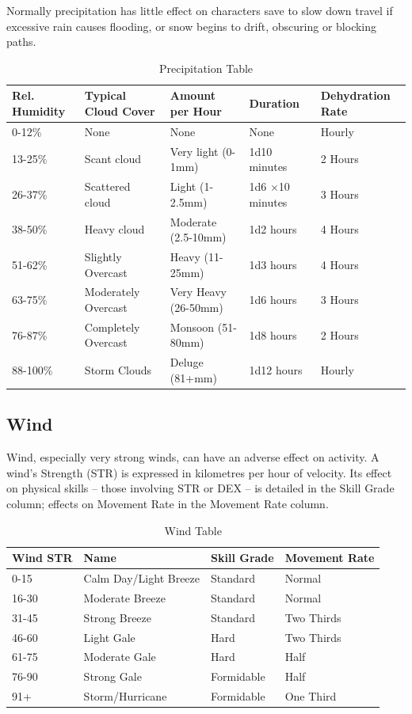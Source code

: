 \documentclass[10pt]{article}
\begin{document}
Normally precipitation has little effect on characters save to slow down travel if excessive rain causes flooding, or snow begins to drift, obscuring or blocking paths.

\begin{table}[h]
\centering
\caption{Precipitation Table}
\label{tab:precipitation}
\begin{tabular}{lllll}
\toprule
\textbf{Rel. Humidity} & \textbf{Typical Cloud Cover} & \textbf{Amount per Hour} & \textbf{Duration} & \textbf{Dehydration Rate} \\
\midrule
0-12\% & None & None & None & Hourly \\
13-25\% & Scant cloud & Very light (0-1mm) & 1d10 minutes & 2 Hours \\
26-37\% & Scattered cloud & Light (1-2.5mm) & 1d6 ×10 minutes & 3 Hours \\
38-50\% & Heavy cloud & Moderate (2.5-10mm) & 1d2 hours & 4 Hours \\
51-62\% & Slightly Overcast & Heavy (11-25mm) & 1d3 hours & 4 Hours \\
63-75\% & Moderately Overcast & Very Heavy (26-50mm) & 1d6 hours & 3 Hours \\
76-87\% & Completely Overcast & Monsoon (51-80mm) & 1d8 hours & 2 Hours \\
88-100\% & Storm Clouds & Deluge (81+mm) & 1d12 hours & Hourly \\
\bottomrule
\end{tabular}
\end{table}

\subsection{Wind}
\label{sec:wind}
Wind, especially very strong winds, can have an adverse effect on activity. A wind's Strength (STR) is expressed in kilometres per hour of velocity. Its effect on physical skills – those involving STR or DEX – is detailed in the Skill Grade column; effects on Movement Rate in the Movement Rate column.

\begin{table}[h]
\centering
\caption{Wind Table}
\label{tab:wind}
\begin{tabular}{llll}
\toprule
\textbf{Wind STR} & \textbf{Name} & \textbf{Skill Grade} & \textbf{Movement Rate} \\
\midrule
0-15 & Calm Day/Light Breeze & Standard & Normal \\
16-30 & Moderate Breeze & Standard & Normal \\
31-45 & Strong Breeze & Standard & Two Thirds \\
46-60 & Light Gale & Hard & Two Thirds \\
61-75 & Moderate Gale & Hard & Half \\
76-90 & Strong Gale & Formidable & Half \\
91+ & Storm/Hurricane & Formidable & One Third \\
\bottomrule
\end{tabular}
\end{table}
\end{document}
